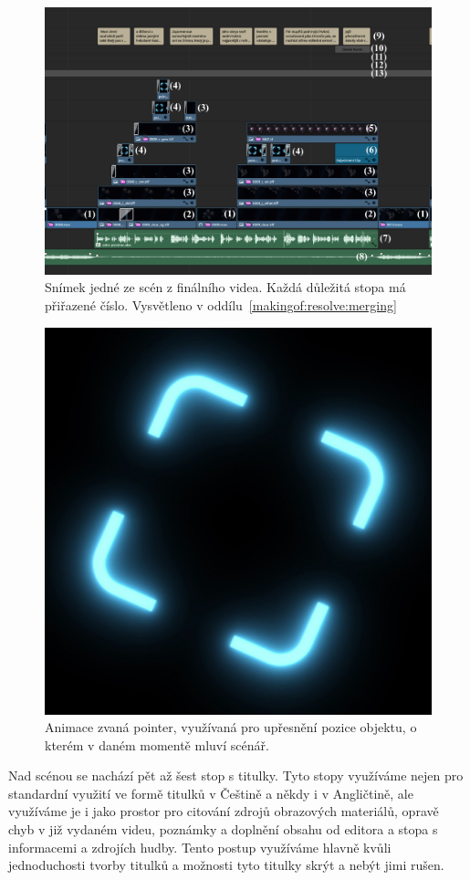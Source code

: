\documentclass[12pt,a4paper,titlepage]{article}
\begin{document}
\begin{figure}[H]
	\centering
	\includegraphics[width=1\textwidth]{timeline_annotated.eps}
	\caption{Snímek jedné ze scén z finálního videa. Každá důležitá stopa má přiřazené číslo. Vysvětleno v oddílu~\ref{makingof:resolve:merging}}\label{img:timeline}
\end{figure}

\begin{figure}[H]
	\centering
	\includegraphics[width=.5\textwidth]{pointer.eps}
	\caption{Animace zvaná pointer, využívaná pro upřesnění pozice objektu, o kterém v daném momentě mluví scénář.}\label{img:pointer}
\end{figure}

Nad scénou se nachází pět až šest stop s titulky. Tyto stopy využíváme nejen pro standardní využití ve formě titulků v Češtině a někdy i v Angličtině, ale využíváme je i jako prostor pro citování zdrojů obrazových materiálů, opravě chyb v již vydaném videu, poznámky a doplnění obsahu od editora a stopa s informacemi a zdrojích hudby. Tento postup využíváme hlavně kvůli jednoduchosti tvorby titulků a možnosti tyto titulky skrýt a nebýt jimi rušen. 
\end{document}
